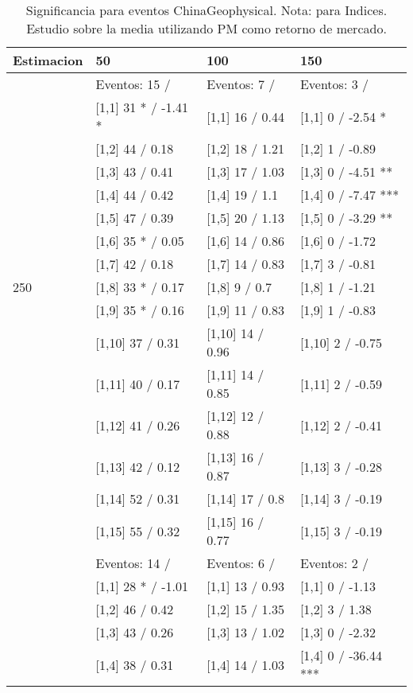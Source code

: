 \begin{table}

\caption{Significancia para eventos ChinaGeophysical. Nota: para Indices. Estudio sobre la media utilizando PM como retorno de mercado.}
\centering
\begin{tabular}[t]{llll}
\toprule
Estimacion & 50 & 100 & 150\\
\midrule
 & Eventos:  15 / & Eventos:  7 / & Eventos:  3 /\\
 & {}[1,1] 31 * / -1.41 * & {}[1,1] 16  / 0.44 & {}[1,1] 0  / -2.54 *\\
 & {}[1,2] 44  / 0.18 & {}[1,2] 18  / 1.21 & {}[1,2] 1  / -0.89\\
 & {}[1,3] 43  / 0.41 & {}[1,3] 17  / 1.03 & {}[1,3] 0  / -4.51 **\\
 & {}[1,4] 44  / 0.42 & {}[1,4] 19  / 1.1 & {}[1,4] 0  / -7.47 ***\\
\addlinespace
 & {}[1,5] 47  / 0.39 & {}[1,5] 20  / 1.13 & {}[1,5] 0  / -3.29 **\\
 & {}[1,6] 35 * / 0.05 & {}[1,6] 14  / 0.86 & {}[1,6] 0  / -1.72\\
 & {}[1,7] 42  / 0.18 & {}[1,7] 14  / 0.83 & {}[1,7] 3  / -0.81\\
250 & {}[1,8] 33 * / 0.17 & {}[1,8] 9  / 0.7 & {}[1,8] 1  / -1.21\\
 & {}[1,9] 35 * / 0.16 & {}[1,9] 11  / 0.83 & {}[1,9] 1  / -0.83\\
\addlinespace
 & {}[1,10] 37  / 0.31 & {}[1,10] 14  / 0.96 & {}[1,10] 2  / -0.75\\
 & {}[1,11] 40  / 0.17 & {}[1,11] 14  / 0.85 & {}[1,11] 2  / -0.59\\
 & {}[1,12] 41  / 0.26 & {}[1,12] 12  / 0.88 & {}[1,12] 2  / -0.41\\
 & {}[1,13] 42  / 0.12 & {}[1,13] 16  / 0.87 & {}[1,13] 3  / -0.28\\
 & {}[1,14] 52  / 0.31 & {}[1,14] 17  / 0.8 & {}[1,14] 3  / -0.19\\
\addlinespace
 & {}[1,15] 55  / 0.32 & {}[1,15] 16  / 0.77 & {}[1,15] 3  / -0.19\\
 & Eventos:  14 / & Eventos:  6 / & Eventos:  2 /\\
 & {}[1,1] 28 * / -1.01 & {}[1,1] 13  / 0.93 & {}[1,1] 0  / -1.13\\
 & {}[1,2] 46  / 0.42 & {}[1,2] 15  / 1.35 & {}[1,2] 3  / 1.38\\
 & {}[1,3] 43  / 0.26 & {}[1,3] 13  / 1.02 & {}[1,3] 0  / -2.32\\
\addlinespace
 & {}[1,4] 38  / 0.31 & {}[1,4] 14  / 1.03 & {}[1,4] 0  / -36.44 ***\\

\end{tabular}
\end{table}
